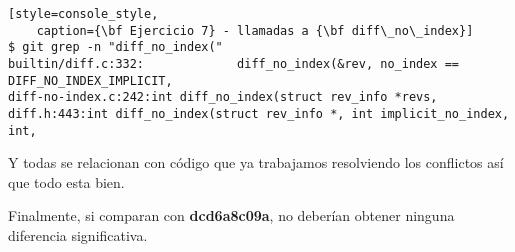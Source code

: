 \begin{lstlisting}[style=console_style,
	caption={\bf Ejercicio 7} - llamadas a {\bf diff\_no\_index}]
$ git grep -n "diff_no_index("
builtin/diff.c:332:             diff_no_index(&rev, no_index == DIFF_NO_INDEX_IMPLICIT, 
diff-no-index.c:242:int diff_no_index(struct rev_info *revs,
diff.h:443:int diff_no_index(struct rev_info *, int implicit_no_index, int,
\end{lstlisting}

Y todas se relacionan con código que ya trabajamos resolviendo los conflictos así que todo esta bien.

Finalmente, si comparan con {\bf dcd6a8c09a}, no deberían obtener ninguna diferencia significativa.

